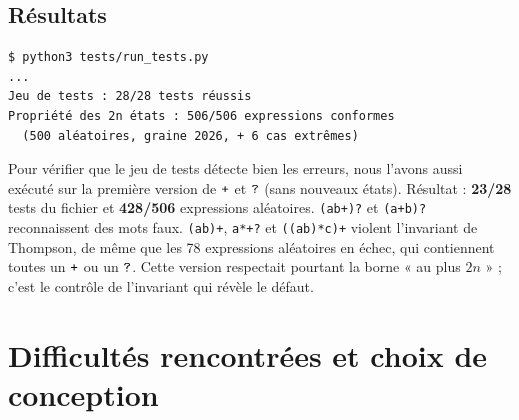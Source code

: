 \documentclass[12pt,a4paper]{article}
\newcommand{\code}[1]{{\fontsize{10}{12}\selectfont\texttt{#1}}}
\newcommand{\tok}[1]{\ensuremath{\text{\fontsize{10}{12}\selectfont\ttfamily #1}}}
\begin{document}
\subsection{Résultats}

\begin{lstlisting}[style=base]
$ python3 tests/run_tests.py
...
Jeu de tests : 28/28 tests réussis
Propriété des 2n états : 506/506 expressions conformes
  (500 aléatoires, graine 2026, + 6 cas extrêmes)
\end{lstlisting}

Pour vérifier que le jeu de tests détecte bien les erreurs, nous l'avons aussi exécuté sur la
première version de \tok{+} et \tok{?} (sans nouveaux états). Résultat : \textbf{23/28} tests
du fichier et \textbf{428/506} expressions aléatoires. \code{(ab+)?} et \code{(a+b)?}
reconnaissent des mots faux. \code{(ab)+}, \code{a*+?} et \code{((ab)*c)+} violent
l'invariant de Thompson, de même que les 78 expressions aléatoires en échec, qui contiennent
toutes un \tok{+} ou un \tok{?}. Cette version respectait pourtant la borne « au plus $2n$ » ;
c'est le contrôle de l'invariant qui révèle le défaut.

\section{Difficultés rencontrées et choix de conception}\label{sec:difficultes}
\end{document}
